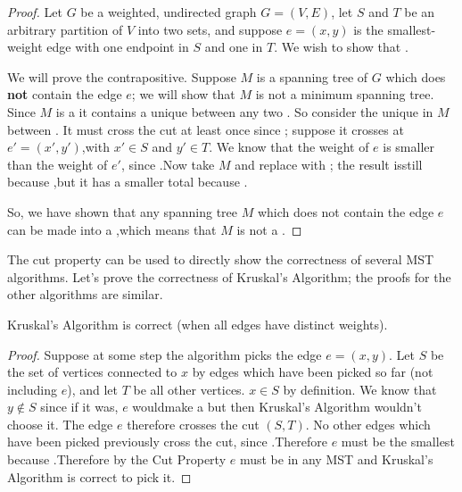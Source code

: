 \documentclass{tufte-handout}
\begin{document}
\begin{proof}
  Let $G$ be a weighted, undirected graph $G = (V,E)$, let $S$ and $T$
  be an arbitrary partition of $V$ into two sets, and suppose
  $e = (x,y)$ is the smallest-weight edge with one endpoint in $S$ and
  one in $T$.  We wish to show that \blank.

  We will prove the contrapositive. Suppose $M$ is a spanning tree of
  $G$ which does \textbf{not} contain the edge $e$; we will show that
  $M$ is not a minimum spanning tree.  Since $M$ is a
  \blank it contains a unique \blank\linebreak between any two
  \blank. So consider the unique \blank\linebreak in $M$ between
  \blank.   It must cross the
  cut at least once since\linebreak \mbox{} \blank; suppose it crosses
  at $e' = (x',y')$,\linebreak with $x' \in S$ and $y' \in T$.  We
  know that the weight of $e$ is smaller than the weight of $e'$,
  since \blank.\linebreak Now take $M$ and replace \blank with \blank;
  the result is\linebreak still \blank because
  \blank,\linebreak but it has a smaller total \blank because \blank.

  So, we have shown that any spanning tree $M$ which does not contain
  the edge $e$ can be made into a \blank,\linebreak which means that
  $M$ is not a \blank.
\end{proof}

The cut property can be used to directly show the correctness of
several MST algorithms.  Let's prove the correctness of Kruskal's
Algorithm; the proofs for the other algorithms are similar.

\begin{thm}
  Kruskal's Algorithm is correct (when all edges have distinct
  weights).
\end{thm}

\begin{proof}
  Suppose at some step the algorithm picks the edge $e = (x,y)$.  Let
  $S$ be the set of vertices connected to $x$ by edges which have been
  picked so far (not including $e$), and let $T$ be all other
  vertices. $x \in S$ by definition.  We know that $y \notin S$ since
  if it was, $e$ would\linebreak make a \blank but then Kruskal's
  Algorithm wouldn't choose it. The edge $e$ therefore crosses the cut
  $(S,T)$. No other edges which have been picked previously cross the
  cut, since \blank.\linebreak Therefore $e$ must be the smallest
  \blank\linebreak because \blank.\linebreak Therefore by the Cut
  Property $e$ must be in any MST and Kruskal's Algorithm is correct
  to pick it.
\end{proof}
\end{document}
